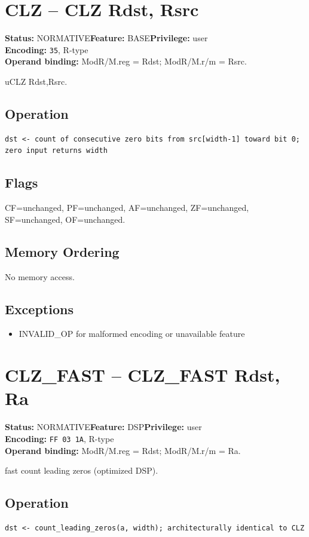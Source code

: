 \documentclass[10pt]{article}
\begin{document}
\section{CLZ -- CLZ Rdst, Rsrc}
\textbf{Status:} NORMATIVE\quad \textbf{Feature:} BASE\quad \textbf{Privilege:} user\\
\textbf{Encoding:} \texttt{35}, R-type\\
\textbf{Operand binding:} ModR/M.reg = Rdst; ModR/M.r/m = Rsrc.

uCLZ Rdst,Rsrc.

\subsection*{Operation}
\begin{lstlisting}
dst <- count of consecutive zero bits from src[width-1] toward bit 0; zero input returns width
\end{lstlisting}
\subsection*{Flags}
CF=unchanged, PF=unchanged, AF=unchanged, ZF=unchanged, SF=unchanged, OF=unchanged.
\subsection*{Memory Ordering}
No memory access.
\subsection*{Exceptions}
\begin{itemize}
\item INVALID\_OP for malformed encoding or unavailable feature
\end{itemize}
\clearpage

\section{CLZ\_FAST -- CLZ\_FAST Rdst, Ra}
\textbf{Status:} NORMATIVE\quad \textbf{Feature:} DSP\quad \textbf{Privilege:} user\\
\textbf{Encoding:} \texttt{FF 03 1A}, R-type\\
\textbf{Operand binding:} ModR/M.reg = Rdst; ModR/M.r/m = Ra.

fast count leading zeros (optimized DSP).

\subsection*{Operation}
\begin{lstlisting}
dst <- count_leading_zeros(a, width); architecturally identical to CLZ
\end{lstlisting}
\end{document}

